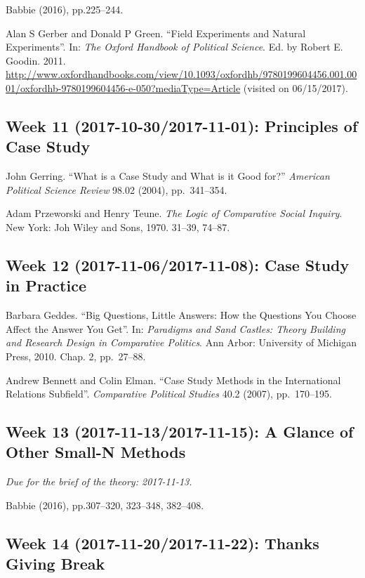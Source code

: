 \documentclass[11pt,]{article}
\theoremstyle{definition}
\theoremstyle{definition}
\theoremstyle{definition}
\theoremstyle{remark}
\begin{document}
Babbie (2016), pp.225--244.

Alan S Gerber and Donald P Green. ``Field Experiments and Natural
Experiments''. In: \emph{The Oxford Handbook of Political Science}. Ed.
by Robert E. Goodin. 2011.
\url{http://www.oxfordhandbooks.com/view/10.1093/oxfordhb/9780199604456.001.0001/oxfordhb-9780199604456-e-050?mediaType=Article}
(visited on 06/15/2017).

\subsection{Week 11 (2017-10-30/2017-11-01): Principles of Case
Study}\label{week-11-2017-10-302017-11-01-principles-of-case-study}

John Gerring. ``What is a Case Study and What is it Good for?''
\emph{American Political Science Review} 98.02 (2004), pp.~341--354.

Adam Przeworski and Henry Teune.
\emph{The Logic of Comparative Social Inquiry}. New York: Joh Wiley and
Sons, 1970. 31--39, 74--87.

\subsection{Week 12 (2017-11-06/2017-11-08): Case Study in
Practice}\label{week-12-2017-11-062017-11-08-case-study-in-practice}

Barbara Geddes. ``Big Questions, Little Answers: How the Questions You
Choose Affect the Answer You Get''. In:
\emph{Paradigms and Sand Castles: Theory Building and Research Design in Comparative Politics}.
Ann Arbor: University of Michigan Press, 2010. Chap. 2, pp.~27--88.

Andrew Bennett and Colin Elman. ``Case Study Methods in the
International Relations Subfield''. \emph{Comparative Political Studies}
40.2 (2007), pp.~170--195.

\subsection{Week 13 (2017-11-13/2017-11-15): A Glance of Other Small-N
Methods}\label{week-13-2017-11-132017-11-15-a-glance-of-other-small-n-methods}

\emph{Due for the brief of the theory: 2017-11-13.}

Babbie (2016), pp.307--320, 323--348, 382--408.

\subsection{Week 14 (2017-11-20/2017-11-22): Thanks Giving
Break}\label{week-14-2017-11-202017-11-22-thanks-giving-break}
\end{document}
